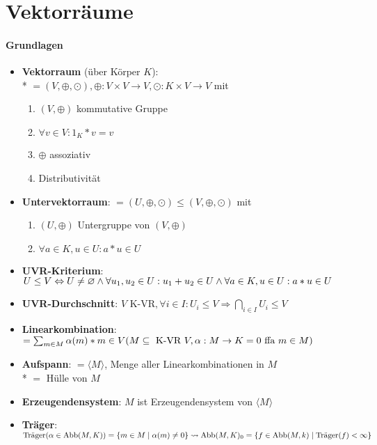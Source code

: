 \section{\label{sec:Vektorraeume}Vektorräume}

\paragraph{Grundlagen}
\begin{itemize}
	\item \textbf{Vektorraum} (über Körper $K$): \\* $=(V,\oplus,\odot), \oplus: V \times V \rightarrow V, \odot: K \times V \rightarrow V$ mit
	\begin{enumerate}
		\item $(V,\oplus)$ kommutative Gruppe
		\item $\forall v \in V: 1_K*v=v$
		\item $\oplus$ assoziativ
		\item Distributivität
	\end{enumerate}
	\item \textbf{Untervektorraum}: $=(U,\oplus,\odot) \leq (V,\oplus,\odot)$ mit
	\begin{enumerate}
		\item $(U,\oplus)$ Untergruppe von $(V,\oplus)$
		\item $\forall a \in K, u \in U: a*u \in U$
	\end{enumerate}
	\item \textbf{UVR-Kriterium}: $U \leq V \\* \Leftrightarrow U \neq \varnothing \wedge \forall u_1, u_2 \in U: u_1+u_2 \in U \wedge \forall a \in K, u \in U: a*u \in U$
	\item \textbf{UVR-Durchschnitt}: $V \text{ K-VR}, \forall i \in I: U_i \leq V \Rightarrow \bigcap_{i \in I} U_i \leq V$
	\item \textbf{Linearkombination}: $=\sum_{m \in M} \alpha(m)*m \in V \\* (M \subseteq \text{ K-VR } V, \alpha: M \rightarrow K=0 \text{ ffa } m \in M)$
	\item \textbf{Aufspann}: $=\langle M \rangle$, Menge aller Linearkombinationen in $M$ \\* $=$ Hülle von $M$
	\item \textbf{Erzeugendensystem}: $M$ ist Erzeugendensystem von $\langle M \rangle$
	\item \textbf{Träger}: $\text{Träger}(\alpha \in \text{Abb}(M,K))=\{ m \in M \mid \alpha(m) \neq 0 \} \\* \leadsto \text{Abb}(M,K)_0=\{ f \in \text{Abb}(M,k) \mid \text{Träger}(f) < \infty \}$

\end{itemize}
